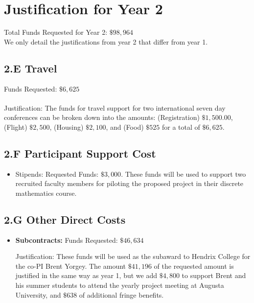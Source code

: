 \documentclass[11pt]{article}
\begin{document}
\section{Justification for Year 2}
\label{sec:justification_for_year_2}

Total Funds Requested for Year 2: $\$98,964$\\

\noindent
We only detail the justifications from year 2 that differ from year 1.

\subsection*{2.E Travel}
\label{subsec:travel}
Funds Requested: $\$6,625$\\ \ \\ Justification: The funds for travel
support for two international seven day conferences can be broken down
into the amounts: (Registration) $\$1,500.00$, (Flight) $\$2,500$,
(Housing) $\$2,100$, and (Food) $\$525$ for a total of $\$6,625$.

\subsection*{2.F Participant Support Cost }
\label{subsec:2.f_participant_support_cost_}
\begin{itemize}
\item Stipends: Requested Funds: $\$3,000$.  These funds will be used
  to support two recruited faculty members for piloting the proposed
  project in their discrete mathematics course.
\end{itemize}

\subsection*{2.G Other Direct Costs}
\label{subsec:other}

\begin{itemize}
\item \textbf{Subcontracts:} Funds Requested: $\$46,634$

  Justification: These funds will be used as the subaward to Hendrix
  College for the co-PI Brent Yorgey.  The amount $\$41,196$ of the
  requested amount is justified in the same way as year 1, but we add
  $\$4,800$ to support Brent and his summer students to attend the
  yearly project meeting at Augusta University, and $\$638$ of
  additional fringe benefits.
\end{itemize}
\end{document}
